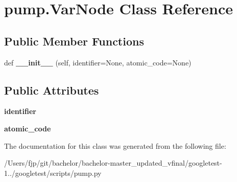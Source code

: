 \hypertarget{classpump_1_1_var_node}{}\section{pump.\+Var\+Node Class Reference}
\label{classpump_1_1_var_node}
\subsection*{Public Member Functions}
\begin{DoxyCompactItemize}
\item 
\mbox{\label{classpump_1_1_var_node_adf79bf21b1db5367792a4ac91f94a756}} 
def {\bfseries \+\_\+\+\_\+init\+\_\+\+\_\+} (self, identifier=None, atomic\+\_\+code=None)
\end{DoxyCompactItemize}
\subsection*{Public Attributes}
\begin{DoxyCompactItemize}
\item 
\mbox{\label{classpump_1_1_var_node_aa2b634e2443646c3754f2d193efa4dc7}} 
{\bfseries identifier}
\item 
\mbox{\label{classpump_1_1_var_node_ad6bef6a8577b994fbe9ccddf3c82d2fc}} 
{\bfseries atomic\+\_\+code}
\end{DoxyCompactItemize}


The documentation for this class was generated from the following file\+:\begin{DoxyCompactItemize}
\item 
/\+Users/fjp/git/bachelor/bachelor-\/master\+\_\+updated\+\_\+vfinal/googletest-\/1../googletest/scripts/pump.\+py\end{DoxyCompactItemize}
